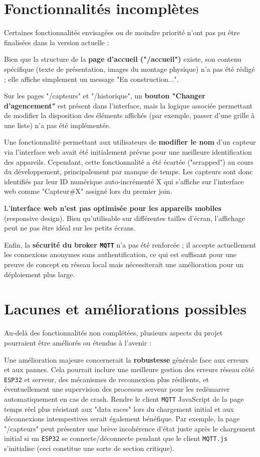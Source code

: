 \documentclass[12pt]{article}
\begin{document}
\section{Fonctionnalités incomplètes}

Certaines fonctionnalités envisagées ou de moindre priorité n'ont pas pu être finalisées dans la version actuelle :

Bien que la structure de la \textbf{page d'accueil ("/accueil")} existe, son contenu spécifique (texte de présentation, images du montage physique) n'a pas été rédigé ; elle affiche simplement un message "En construction...".

Sur les pages "/capteurs" et "/historique", un \textbf{bouton "Changer d'agencement"} est présent dans l'interface, mais la logique associée permettant de modifier la disposition des éléments affichés (par exemple, passer d'une grille à une liste) n'a pas été implémentée.

Une fonctionnalité permettant aux utilisateurs de \textbf{modifier le nom} d'un capteur via l'interface web avait été initialement prévue pour une meilleure identification des appareils. Cependant, cette fonctionnalité a été écartée ("scrapped") au cours du développement, principalement par manque de temps. Les capteurs sont donc identifiés par leur ID numérique auto-incrémenté X qui s'affiche sur l'interface web comme "Capteur\#X" assigné lors du premier join.

L'\textbf{interface web n'est pas optimisée pour les appareils mobiles} (responsive design). Bien qu'utilisable sur différentes tailles d'écran, l'affichage peut ne pas être idéal sur les petits écrans.

Enfin, la \textbf{sécurité du broker \texttt{MQTT}} n'a pas été renforcée ; il accepte actuellement les connexions anonymes sans authentification, ce qui est suffisant pour une preuve de concept en réseau local mais nécessiterait une amélioration pour un déploiement plus large.


\section{Lacunes et améliorations possibles}

Au-delà des fonctionnalités non complétées, plusieurs aspects du projet pourraient être améliorés ou étendus à l'avenir :

Une amélioration majeure concernerait la \textbf{robustesse} générale face aux erreurs et aux pannes. Cela pourrait inclure une meilleure gestion des erreurs réseau côté \texttt{ESP32} et serveur, des mécanismes de reconnexion plus résilients, et éventuellement une supervision des processus serveur pour les redémarrer automatiquement en cas de crash. Rendre le client \texttt{MQTT} JavaScript de la page temps réel plus résistant aux "data races" lors du chargement initial et aux déconnexions intempestives serait également bénéfique. Par exemple, la page "/capteurs" peut présenter une brève incohérence d'état juste après le chargement initial si un \texttt{ESP32} se connecte/déconnecte pendant que le client \texttt{MQTT.js} s'initialise (ceci constitue une sorte de section critique).
\end{document}
